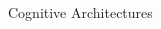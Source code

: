 \documentclass[compress]{beamer}
\begin{document}
{{\begin{frame}{Cognitive Architectures}
\begin{multicols}{2}

    \end{multicols}
\end{frame}
}


%


}
\end{document}
